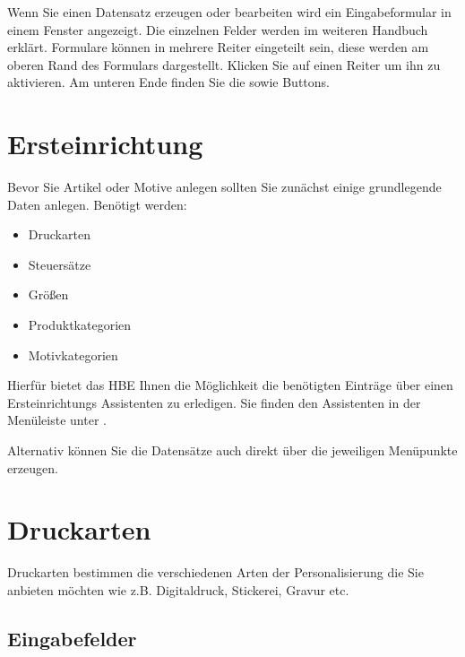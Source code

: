 \documentclass[letterpaper,10pt,ngerman]{sphinxmanual}
\begin{document}
Wenn Sie einen Datensatz erzeugen oder bearbeiten wird ein Eingabeformular in einem Fenster angezeigt. Die einzelnen
Felder werden im weiteren Handbuch erklärt. Formulare können in mehrere Reiter eingeteilt sein, diese werden am oberen
Rand des Formulars dargestellt. Klicken Sie auf einen Reiter um ihn zu aktivieren.
Am unteren Ende finden Sie die  sowie  Buttons.


\section{Ersteinrichtung}
\label{\detokenize{hbe/setup:ersteinrichtung}}\label{\detokenize{hbe/setup::doc}}
Bevor Sie Artikel oder Motive anlegen sollten Sie zunächst einige grundlegende Daten anlegen. Benötigt werden:
\begin{itemize}
\item {} 
Druckarten

\item {} 
Steuersätze

\item {} 
Größen

\item {} 
Produktkategorien

\item {} 
Motivkategorien

\end{itemize}

Hierfür bietet das HBE Ihnen die Möglichkeit die benötigten Einträge über einen Ersteinrichtungs Assistenten zu erledigen.
Sie finden den Assistenten in der Menüleiste unter \sphinxstyleemphasis{} .

Alternativ können Sie die Datensätze auch direkt über die jeweiligen Menüpunkte erzeugen.


\section{Druckarten}
\label{\detokenize{hbe/printtypes:druckarten}}\label{\detokenize{hbe/printtypes::doc}}
Druckarten bestimmen die verschiedenen Arten der Personalisierung die Sie anbieten möchten
wie z.B. Digitaldruck, Stickerei, Gravur etc.


\subsection{Eingabefelder}
\label{\detokenize{hbe/printtypes:eingabefelder}}
\end{document}
